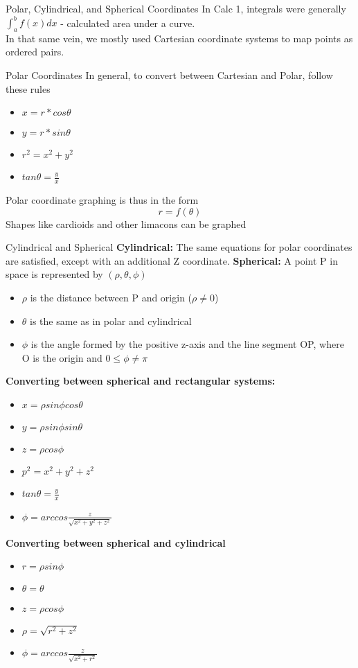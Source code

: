 \documentclass[a4paper, 12pt]{article}
\begin{document}
\begin{section}{Polar, Cylindrical, and Spherical Coordinates}
In Calc 1, integrals were generally $\int_{a}^{b}f(x)dx$ - calculated area under a curve.\\
In that same vein, we mostly used Cartesian coordinate systems to map points as ordered pairs.
\begin{subsection}{Polar Coordinates}
In general, to convert between Cartesian and Polar, follow these rules
\begin{itemize}
\item{$x=r*cos\theta$}
\item{$y=r*sin\theta$}
\item{$r^{2}=x^{2}+y^{2}$}
\item{$tan\theta = \frac{y}{x}$}
\end{itemize}
Polar coordinate graphing is thus in the form
\begin{equation}
r=f(\theta)
\end{equation}
Shapes like cardioids and other limacons can be graphed
\end{subsection}
\begin{subsection}{Cylindrical and Spherical}
\textbf{Cylindrical:} The same equations for polar coordinates are satisfied, except with an additional Z coordinate.
\textbf{Spherical:} A point P in space is represented by $(\rho ,\theta, \phi)$
\begin{itemize}
\item{$\rho$ is the distance between P and origin ($\rho\neq 0$)}
\item{$\theta$ is the same as in polar and cylindrical}
\item{$\phi$ is the angle formed by the positive z-axis and the line segment OP, where O is 
the origin and $0\leq\phi\neq\pi$}
\end{itemize}
\textbf{Converting between spherical and rectangular systems:}
\begin{itemize}
\item{$x=\rho sin\phi cos\theta$}
\item{$y=\rho sin \phi sin \theta$}
\item{$z=\rho cos\phi$}
\item{$p^{2}=x^{2}+y^{2}+z^{2}$}
\item{$tan\theta = \frac{y}{x}$}
\item{$\phi = arccos \frac{z}{\sqrt{x^{2}+y^{2}+z^{2}}}$}
\end{itemize}
\textbf{Converting between spherical and cylindrical}
\begin{itemize}
\item{$r=\rho sin\phi$}
\item{$\theta = \theta$}
\item{$z=\rho cos \phi$}
\item{$\rho=\sqrt{r^{2}+z^{2}}$}
\item{$\phi = arccos \frac{z}{\sqrt{x^{2}+r^{2}}}$}
\end{itemize}
\end{subsection}
\end{section}
\end{document}
